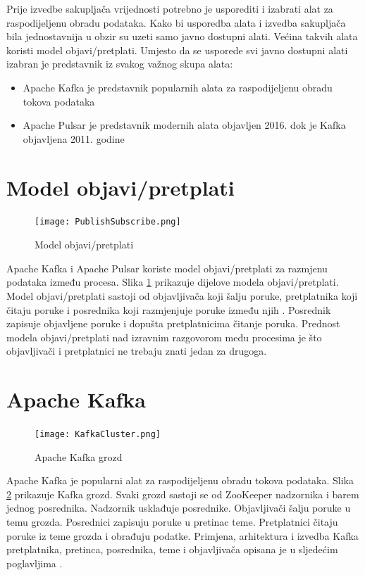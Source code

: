 \documentclass[utf8, diplomski, lmodern, numeric]{fer}
\begin{document}
Prije izvedbe sakupljača vrijednosti potrebno je usporediti i izabrati alat za raspodijeljenu obradu podataka. Kako bi usporedba alata i izvedba sakupljača bila jednostavnija u obzir su uzeti samo javno dostupni alati. Većina takvih alata koristi model objavi/pretplati. Umjesto da se usporede svi javno dostupni alati izabran je predstavnik iz svakog važnog skupa alata:
\begin{itemize}
    \item Apache Kafka je predstavnik popularnih alata za raspodijeljenu obradu tokova podataka
    \item Apache Pulsar \citep{yahoo-blogpost} je predstavnik modernih alata objavljen 2016. dok je Kafka \citep{kafka-whitepaper} objavljena 2011. godine
\end{itemize}


\section{Model objavi/pretplati}

\begin{figure}[H]
    \centering
    \texttt{[image: PublishSubscribe.png]}
    \caption{Model objavi/pretplati}
    \label{fig:publish-subscribe}
\end{figure}

Apache Kafka i Apache Pulsar koriste model objavi/pretplati  za razmjenu podataka između procesa. Slika \ref{fig:publish-subscribe} prikazuje dijelove modela objavi/pretplati. Model objavi/pretplati sastoji od objavljivača  koji šalju poruke, pretplatnika  koji čitaju poruke i posrednika  koji razmjenjuje poruke između njih \citep{rassus-manual}. Posrednik zapisuje objavljene poruke i dopušta pretplatnicima čitanje poruka. Prednost modela objavi/pretplati nad izravnim razgovorom među procesima je što objavljivači i pretplatnici ne trebaju znati jedan za drugoga.


\section{Apache Kafka}

\begin{figure}[H]
    \centering
    \texttt{[image: KafkaCluster.png]}
    \caption{Apache Kafka grozd}
    \label{fig:kafka-cluster}
\end{figure}

Apache Kafka je popularni alat za raspodijeljenu obradu tokova podataka. Slika \ref{fig:kafka-cluster} prikazuje Kafka grozd. Svaki grozd sastoji se od ZooKeeper nadzornika i barem jednog posrednika. Nadzornik usklađuje posrednike. Objavljivači šalju poruke u temu grozda. Posrednici zapisuju poruke u pretinac teme. Pretplatnici čitaju poruke iz teme grozda i obrađuju podatke. Primjena, arhitektura i izvedba Kafka pretplatnika, pretinca, posrednika, teme i objavljivača opisana je u sljedećim poglavljima \citep{kafka-whitepaper} \citep{kafka-docs}.
\end{document}
